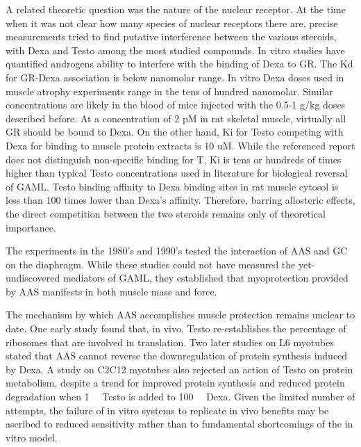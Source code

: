 \documentclass[12pt,english]{report}\usepackage[]{graphicx}\usepackage[]{color}
\begin{document}
A related theoretic question was the nature of the nuclear receptor.
At the time when it was not clear how many species of nuclear receptors
there are, precise measurements tried to find putative interference
between the various steroids, with Dexa and Testo among the most studied
compounds. In vitro studies have quantified androgens ability to interfere
with the binding of Dexa to GR. The Kd for GR-Dexa association is
below nanomolar range\citep{levy1989glucocorticoid}. In vitro Dexa
doses used in muscle atrophy experiments range in the tens of hundred
nanomolar. Similar concentrations are likely in the blood of mice
injected with the 0.5-1 g/kg doses described before. At a concentration
of 2 pM in rat skeletal muscle\citep{dahlberg1981regulation}, virtually
all GR should be bound to Dexa. On the other hand, Ki for Testo competing
with Dexa for binding to muscle protein extracts is 10 uM\citep{mayer1975interaction}.
While the referenced report does not distinguish non-specific binding
for T, Ki is tens or hundreds of times higher than typical Testo concentrations
used in literature for biological reversal of GAML. Testo binding
affinity to Dexa binding sites in rat muscle cytosol is less than
100 times lower than Dexa's affinity\citep{snochowski1980characterization}.
Therefore, barring allosteric effects, the direct competition between
the two steroids remains only of theoretical importance.

The experiments in the 1980's and 1990's tested the interaction of
AAS and GC on the diaphragm. While these studies could not have measured
the yet-undiscovered mediators of GAML, they established that myoprotection
provided by AAS manifests in both muscle mass and force\citep{ferguson1995effects,vanbalkom1998anabolic,eason2003use}.

The mechanism by which AAS accomplishes muscle protection remains
unclear to date. One early study found that, in vivo, Testo re-establishes
the percentage of ribosomes that are involved in translation\citep{bullock1968effects}.
Two later studies on L6 myotubes stated that AAS cannot reverse the
downregulation of protein synthesis induced by Dexa\citep{ballard1983effects,roeder1986influence}.
A study on C2C12 myotubes also rejected an action of Testo on protein
metabolism, despite a trend for improved protein synthesis and reduced
protein degradation when \SI{1}{\micro\molar} Testo is added to \SI{100}{\nano\molar}
Dexa\citep{desler1996effects}. Given the limited number of attempts,
the failure of in vitro systems to replicate in vivo benefits may
be ascribed to reduced sensitivity rather than to fundamental shortcomings
of the in vitro model.
\end{document}
